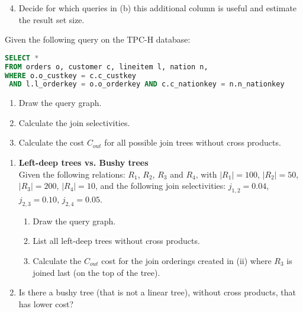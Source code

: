 \begin{enumerate}
\setcounter{enumi}{3}
\item Decide for which queries in (b) this additional column is useful and estimate the result set size.

\end{enumerate}

\newpage
{}

Given the following query on the TPC-H database:

\begin{lstlisting}[language=sql]
SELECT *
FROM orders o, customer c, lineitem l, nation n,
WHERE o.o_custkey = c.c_custkey
 AND l.l_orderkey = o.o_orderkey AND c.c_nationkey = n.n_nationkey
\end{lstlisting}

\begin{enumerate}
\item
 Draw the query graph.
 

\item
 Calculate the join selectivities. 

\item
 Calculate the cost $C_{out}$ for all possible join trees without cross products.
\end{enumerate}


\begin{enumerate}
\item
  {\bf Left-deep trees vs. Bushy trees}\\
  Given the following relations: $R_1$, $R_2$, $R_3$ and $R_4$,
  with $|R_1|=100$, $|R_2|=50$, $|R_3|=200$, $|R_4|=10$, and the following join selectivities:
  $j_{1,2}= 0.04$, $j_{2,3}= 0.10$, $j_{2,4}= 0.05$. 

  \begin{enumerate}
    \item Draw the query graph.
      
    \item List all left-deep trees without cross products. 
      
      
    \item Calculate the $C_{out}$ cost for the join orderings created in (ii) where $R_3$ is joined last (on the top of the tree).
    

  \end{enumerate}

  \item   Is there a bushy tree (that is not a linear tree), without cross products, that has lower cost?
      

\end{enumerate}

